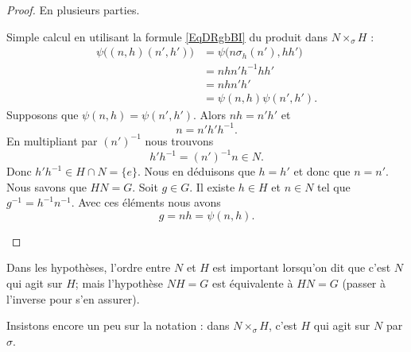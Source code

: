 \begin{proof}
    En plusieurs parties.
    \begin{subproof}
        Simple calcul en utilisant la formule \eqref{EqDRgbBI} du produit dans \( N\times_{\sigma}H\) :
        \begin{subequations}
            \begin{align}
                \psi\big( (n,h)(n',h') \big)&=\psi\big( n\sigma_h(n'),hh' \big)\\
                &=nhn'h^{-1}hh'\\
                &=nhn'h'\\
                &=\psi(n,h)\psi(n',h').
            \end{align}
        \end{subequations}
        Supposons que \( \psi(n,h)=\psi(n',h')\). Alors \( nh=n'h'\) et
        \begin{equation}
            n=n'h'h^{-1}.
        \end{equation}
        En multipliant par \( (n')^{-1}\) nous trouvons
        \begin{equation}
            h'h^{-1}=(n')^{-1}n\in N.
        \end{equation}
        Donc \( h'h^{-1}\in H\cap N=\{ e \}\). Nous en déduisons que \( h=h'\) et donc que \( n=n'\).
        Nous savons que \( HN=G\). Soit \( g\in G\). Il existe \( h\in H\) et \( n\in N\) tel que \( g^{-1}=h^{-1}n^{-1}\). Avec ces éléments nous avons
        \begin{equation}
            g=nh=\psi(n,h).
        \end{equation}
    \end{subproof}
\end{proof}

Dans les hypothèses, l'ordre entre \( N\) et \( H\) est important lorsqu'on dit que c'est \( N\) qui agit sur \( H\); mais l'hypothèse \( NH=G\) est équivalente à \( HN=G\) (passer à l'inverse pour s'en assurer).

Insistons encore un peu sur la notation : dans \( N\times_{\sigma}H\), c'est \( H\) qui agit sur \( N\) par \( \sigma\).


